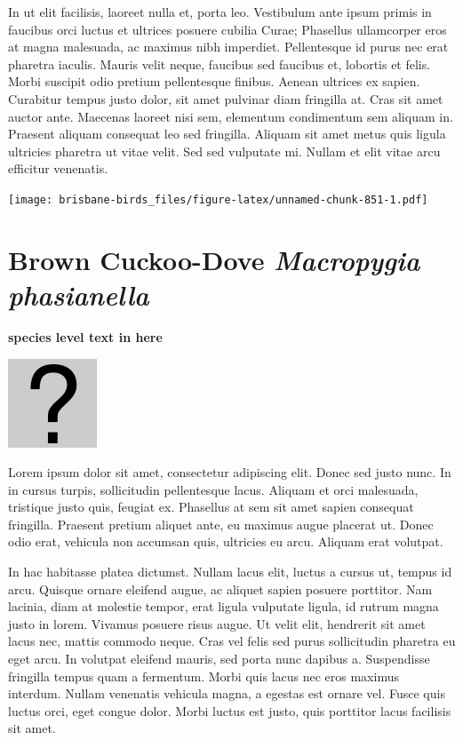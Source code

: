 \documentclass[]{book}
\let\origfigure\figure
\let\endorigfigure\endfigure
\renewenvironment{figure}[1][2] {
  \expandafter\origfigure\expandafter[H]
} {
  \endorigfigure
}
\begin{document}
In ut elit facilisis, laoreet nulla et, porta leo. Vestibulum ante ipsum
primis in faucibus orci luctus et ultrices posuere cubilia Curae;
Phasellus ullamcorper eros at magna malesuada, ac maximus nibh
imperdiet. Pellentesque id purus nec erat pharetra iaculis. Mauris velit
neque, faucibus sed faucibus et, lobortis et felis. Morbi suscipit odio
pretium pellentesque finibus. Aenean ultrices ex sapien. Curabitur
tempus justo dolor, sit amet pulvinar diam fringilla at. Cras sit amet
auctor ante. Maecenas laoreet nisi sem, elementum condimentum sem
aliquam in. Praesent aliquam consequat leo sed fringilla. Aliquam sit
amet metus quis ligula ultricies pharetra ut vitae velit. Sed sed
vulputate mi. Nullam et elit vitae arcu efficitur venenatis.

\begin{figure}
\centering
\texttt{[image: brisbane-birds\_files/figure-latex/unnamed-chunk-851-1.pdf]}
\caption{\label{fig:unnamed-chunk-851}insert figure caption}
\end{figure}

\section{\texorpdfstring{Brown Cuckoo-Dove \emph{Macropygia
phasianella}}{Brown Cuckoo-Dove Macropygia phasianella}}\label{brown-cuckoo-dove-macropygia-phasianella}

\textbf{species level text in here}

\begin{figure}
\centering
\includegraphics{assets/missing.png}
\caption{No image for species}
\end{figure}

Lorem ipsum dolor sit amet, consectetur adipiscing elit. Donec sed justo
nunc. In in cursus turpis, sollicitudin pellentesque lacus. Aliquam et
orci malesuada, tristique justo quis, feugiat ex. Phasellus at sem sit
amet sapien consequat fringilla. Praesent pretium aliquet ante, eu
maximus augue placerat ut. Donec odio erat, vehicula non accumsan quis,
ultricies eu arcu. Aliquam erat volutpat.

In hac habitasse platea dictumst. Nullam lacus elit, luctus a cursus ut,
tempus id arcu. Quisque ornare eleifend augue, ac aliquet sapien posuere
porttitor. Nam lacinia, diam at molestie tempor, erat ligula vulputate
ligula, id rutrum magna justo in lorem. Vivamus posuere risus augue. Ut
velit elit, hendrerit sit amet lacus nec, mattis commodo neque. Cras vel
felis sed purus sollicitudin pharetra eu eget arcu. In volutpat eleifend
mauris, sed porta nunc dapibus a. Suspendisse fringilla tempus quam a
fermentum. Morbi quis lacus nec eros maximus interdum. Nullam venenatis
vehicula magna, a egestas est ornare vel. Fusce quis luctus orci, eget
congue dolor. Morbi luctus est justo, quis porttitor lacus facilisis sit
amet.
\end{document}
